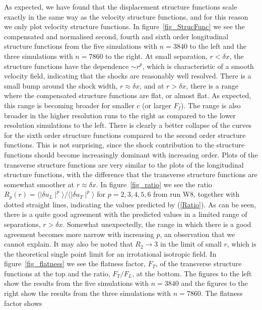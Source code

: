 \documentclass{jfm}
\begin{document}
As expected, we have found that the displacement structure functions scale
exactly in the same way as the velocity structure functions, and for this reason we only plot
velocity structure functions. In figure~\ref{fig_StrucFunc} we see the
compensated and normalised second, fourth and sixth order longitudinal
structure functions from the five simulations with $ n = 3840 $ to the left and
the three simulations with $ n = 7860 $ to the right. At small separation, $ r
< \delta x $, the structure functions have the dependence $ \sim r^{p} $, which
is characteristic of a smooth velocity field, indicating that the shocks are
reasonably well resolved. There is a small bump around the shock width, $ r
\approx \delta x $, and at $ r > \delta x $, there is a range where the
compensated structure functions are flat, or almost flat. As expected, this
range is becoming broader for smaller $ c $ (or larger $ F_f $). The range is
also broader in the higher resolution runs to the right as compared to the
lower resolution simulations to the left. There is clearly a better collapse of
the curves for the sixth order structure functions compared to the second order
structure functions. This is not surprising, since the shock contribution to
the structure functions should become increasingly dominant with increasing
order. Plots of the transverse structure functions are very similar to the
plots of the longitudinal structure functions, with the difference that the
transverse structure functions are somewhat smoother at $ r \approx \delta x $.
In figure~\ref{fig_ratio} we see the ratio $ R_{p}(r) = \langle \mid \delta
u_L \mid ^{p} \rangle / \langle \mid \delta u_T \mid ^{p} \rangle$ for $ p=
2,3,4,5,6 $ from run W8, together with dotted straight lines, indicating the
values predicted by (\ref{Ratio}). As can be seen, there is a quite good
agreement with the predicted values in a limited range of separations, $ r >
\delta x $. Somewhat unexpectedly, the range in which there is a good agreement
becomes more narrow with increasing $ p $, an observation that we cannot
explain. It may also be noted that $ R_2 \rightarrow 3 $ in the limit of small
$ r $, which is the theoretical single point limit for an irrotational
isotropic field. In figure~\ref{fig_flatness} we see the flatness factor, $
F_T $, of the transverse structure functions at the top and the ratio, $
F_T/F_L $, at the bottom. The figures to the left show the results from the
five simulations with $ n = 3840 $ and the figures to the right show the
results from the three simulations with $ n = 7860 $. The flatness factor shows
\end{document}
